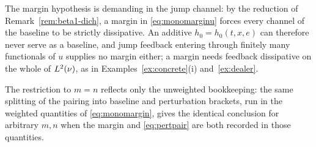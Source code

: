 \noindent The margin hypothesis is demanding in the jump channel: by the reduction of
Remark~\ref{rem:beta1-dich}, a margin in \eqref{eq:monomarginu} forces every channel of
the baseline to be strictly dissipative. An additive $h_0=h_0(t,x,e)$ can therefore never serve as a baseline, and
jump feedback entering through finitely many functionals of $u$ supplies no margin
either; a margin needs feedback dissipative on the whole of $L^2(\nu)$, as in
Examples~\ref{ex:concrete}(i) and~\ref{ex:dealer}.

\begin{remark}\label{rem:generalrank}
The restriction to $m=n$ reflects only the unweighted bookkeeping: the same splitting of
the pairing into baseline and perturbation brackets, run in the weighted quantities of
\eqref{eq:monomargin}, gives the identical conclusion for arbitrary $m,n$ when the margin
and \eqref{eq:pertpair} are both recorded in those quantities.
\end{remark}

